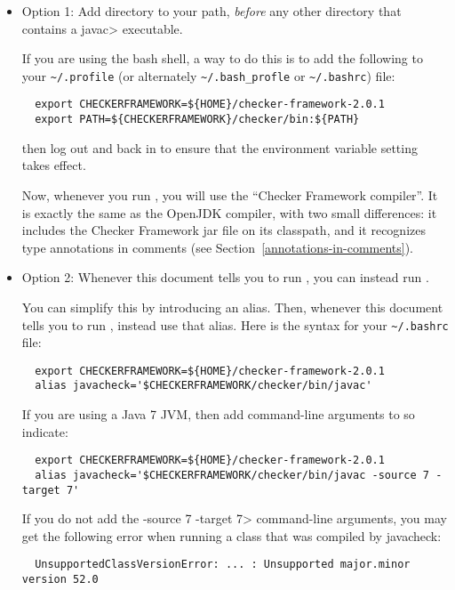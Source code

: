 \begin{itemize}
  \item
    Option 1:
    Add directory
     to your path, \emph{before} any other
    directory that contains a \<javac> executable.

    If you are
    using the bash shell, a way to do this is to add the following to your
    \verb|~/.profile| (or alternately \verb|~/.bash_profle| or \verb|~/.bashrc|) file:
\begin{Verbatim}
  export CHECKERFRAMEWORK=${HOME}/checker-framework-2.0.1
  export PATH=${CHECKERFRAMEWORK}/checker/bin:${PATH}
\end{Verbatim}
    then log out and back in to ensure that the environment variable
    setting takes effect.

    Now, whenever you run , you will use the ``Checker
    Framework compiler''.  It is exactly the same as the OpenJDK compiler,
    with two small differences:  it includes the Checker Framework jar file
    on its classpath, and it recognizes type annotations in comments (see
    Section~\ref{annotations-in-comments}).

  \item
    \begin{sloppypar}
    Option 2:
    Whenever this document tells you to run , you
    can instead run .
    \end{sloppypar}

    You can simplify this by introducing an alias.  Then,
    whenever this document tells you to run , instead use that
    alias.  Here is the syntax for your
    \verb|~/.bashrc| file:
\begin{Verbatim}
  export CHECKERFRAMEWORK=${HOME}/checker-framework-2.0.1
  alias javacheck='$CHECKERFRAMEWORK/checker/bin/javac'
\end{Verbatim}

    If you are using a Java 7 JVM, then add command-line arguments to so
    indicate:

\begin{Verbatim}
  export CHECKERFRAMEWORK=${HOME}/checker-framework-2.0.1
  alias javacheck='$CHECKERFRAMEWORK/checker/bin/javac -source 7 -target 7'
\end{Verbatim}

   If you do not add the \<-source 7 -target 7> command-line arguments, you
   may get the following error when running a class that was compiled by
   javacheck:
\begin{Verbatim}
  UnsupportedClassVersionError: ... : Unsupported major.minor version 52.0
\end{Verbatim}


\end{itemize}
